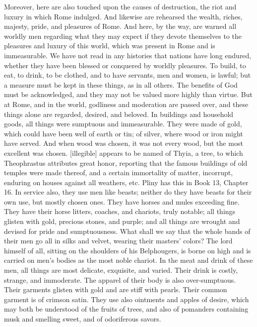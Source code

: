 Moreover, here are also touched upon the causes of destruction, the riot and luxury in which Rome indulged. And likewise are rehearsed the wealth, riches, majesty, pride, and pleasures of Rome. And here, by the way, are warned all worldly men regarding what they may expect if they devote themselves to the pleasures and luxury of this world, which was present in Rome and is immeasurable. We have not read in any histories that nations have long endured, whether they have been blessed or conquered by worldly pleasures. To build, to eat, to drink, to be clothed, and to have servants, men and women, is lawful; but a measure must be kept in these things, as in all others. The benefits of God must be acknowledged, and they may not be valued more highly than virtue. But at Rome, and in the world, godliness and moderation are passed over, and these things alone are regarded, desired, and beloved. In buildings and household goods, all things were sumptuous and immeasurable. They were made of gold, which could have been well of earth or tin; of silver, where wood or iron might have served. And when wood was chosen, it was not every wood, but the most excellent was chosen. [illegible] appears to be named of Thyia, a tree, to which Theophrastus attributes great honor, reporting that the famous buildings of old temples were made thereof, and a certain immortality of matter, incorrupt, enduring on houses against all weathers, etc. Pliny has this in Book 13, Chapter 16. In service also, they use men like beasts; neither do they have beasts for their own use, but mostly chosen ones. They have horses and mules exceeding fine. They have their horse litters, coaches, and chariots, truly notable; all things glisten with gold, precious stones, and purple; and all things are wrought and devised for pride and sumptuousness. What shall we say that the whole bands of their men go all in silks and velvet, wearing their masters’ colors? The lord himself of all, sitting on the shoulders of his Belphougers, is borne on high and is carried on men’s bodies as the most noble chariot. In the meat and drink of these men, all things are most delicate, exquisite, and varied. Their drink is costly, strange, and immoderate. The apparel of their body is also over-sumptuous. Their garments glisten with gold and are stiff with pearls. Their common garment is of crimson satin. They use also ointments and apples of desire, which may both be understood of the fruits of trees, and also of pomanders containing musk and smelling sweet, and of odoriferous savors.

